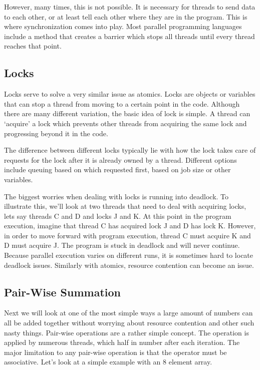 \documentclass{article}
\begin{document}
    However, many times, this is not possible. It is necessary for threads to send data to each other, or at least tell each other where they are in the program. This is where synchronization comes into play. Most parallel programming languages include a method that creates a barrier which stops all threads until every thread reaches that point.

	
    
    \subsection{Locks}
    Locks serve to solve a very similar issue as atomics. Locks are objects or variables that can stop a thread from moving to a certain point in the code. Although there are many different variation, the basic idea of lock is simple. A thread can `acquire' a lock which prevents other threads from acquiring the same lock and progressing beyond it in the code.

    The difference between different locks typically lie with how the lock takes care of requests for the lock after it is already owned by a thread. Different options include queuing based on which requested first, based on job size or other variables.

    The biggest worries when dealing with locks is running into deadlock. To illustrate this, we'll look at two threads that need to deal with acquiring locks, lets say threads C and D and locks J and K. At this point in the program execution, imagine that thread C has acquired lock J and D has lock K. However, in order to move forward with program execution, thread C must acquire K and D must acquire J. The program is stuck in deadlock and will never continue. Because parallel execution varies on different runs, it is sometimes hard to locate deadlock issues. Similarly with atomics, resource contention can become an issue.
	
	\subsection{Pair-Wise Summation}
    \label{sec.pairwise}
    Next we will look at one of the most simple ways a large amount of numbers can all be added together without worrying about resource contention and other such nasty things. Pair-wise operations are a rather simple concept. The operation is applied by numerous threads, which half in number after each iteration. The major limitation to any pair-wise operation is that the operator must be associative. Let's look at a simple example with an 8 element array. 
\end{document}

